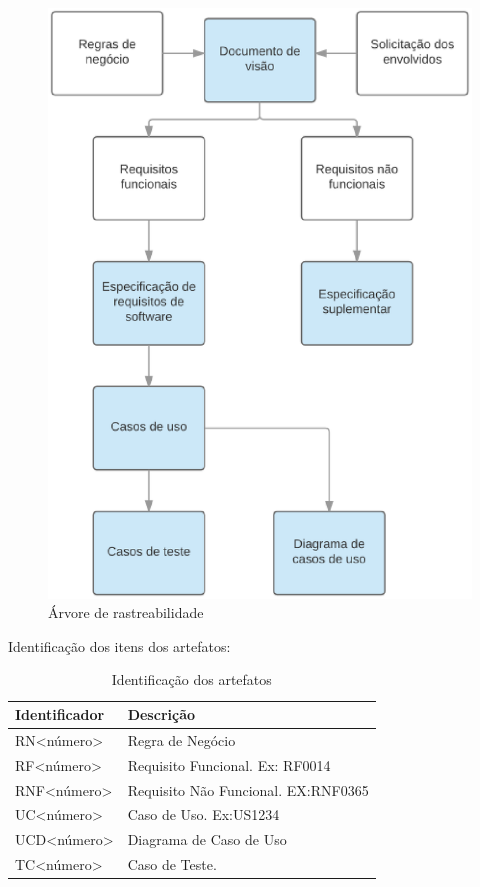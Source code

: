 \begin{figure}[htb]
\centering
  \includegraphics[keepaspectratio=true,scale=0.7]
  {figuras/arvore_rastreabilidade.eps}
  \caption{Árvore de rastreabilidade}
  \label{matrix_requirement}
\end{figure}

Identificação dos itens dos artefatos:

\begin{table}[]
\centering
\label{artefacts-identifier}
\begin{tabular}{|l|l|}
\hline
\textbf{Identificador}         & \textbf{Descrição}                  \\ \hline
RN\textless número\textgreater  & Regra de Negócio                    \\ \hline
RF\textless número\textgreater  & Requisito Funcional. Ex: RF0014     \\ \hline
RNF\textless número\textgreater & Requisito Não Funcional. EX:RNF0365 \\ \hline
UC\textless número\textgreater  & Caso de Uso. Ex:US1234              \\ \hline
UCD\textless número\textgreater & Diagrama de Caso de Uso             \\ \hline
TC\textless número\textgreater  & Caso de Teste.                     \\ \hline
\end{tabular}
\caption{Identificação dos artefatos}
\end{table}

